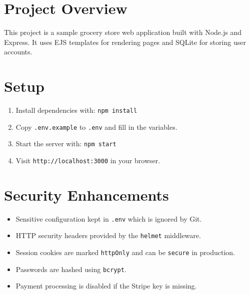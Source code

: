 \section{Project Overview}
This project is a sample grocery store web application built with Node.js and Express.\newline
It uses EJS templates for rendering pages and SQLite for storing user accounts.

\section{Setup}
\begin{enumerate}
  \item Install dependencies with:\newline
  \verb|npm install|
  \item Copy \verb|.env.example| to \verb|.env| and fill in the variables.
  \item Start the server with:\newline
  \verb|npm start|
  \item Visit \verb|http://localhost:3000| in your browser.
\end{enumerate}

\section{Security Enhancements}
\begin{itemize}
  \item Sensitive configuration kept in \verb|.env| which is ignored by Git.
  \item HTTP security headers provided by the \verb|helmet| middleware.
  \item Session cookies are marked \verb|httpOnly| and can be \verb|secure| in production.
  \item Passwords are hashed using \verb|bcrypt|.
  \item Payment processing is disabled if the Stripe key is missing.
\end{itemize}
